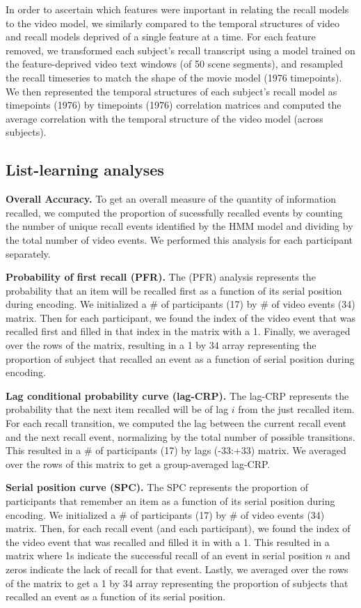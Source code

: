 \documentclass{article}
\begin{document}
In order to ascertain which features were important in relating the recall models to the video model, we similarly compared to the temporal structures of video and recall models deprived of a single feature at a time. For each feature removed, we transformed each subject’s recall transcript using a model trained on the feature-deprived video text windows (of 50 scene segments), and resampled the recall timeseries to match the shape of the movie model (1976 timepoints). We then represented the temporal structures of each subject’s recall model as timepoints (1976) by timepoints (1976) correlation matrices and computed the average correlation with the temporal structure of the video model (across subjects).

\subsection{List-learning analyses}
\textbf{Overall Accuracy.}  To get an overall measure of the quantity of information recalled, we computed the proportion of sucessfully recalled events by counting the number of unique recall events identified by the HMM model and dividing by the total number of video events.  We performed this analysis for each participant separately.

\textbf{Probability of first recall (PFR).}  The (PFR) analysis represents the probability that an item will be recalled first as a function of its serial position during encoding. We initialized a \# of participants (17) by \# of video events (34) matrix. Then for each participant, we found the index of the video event that was recalled first and filled in that index in the matrix with a 1.  Finally, we averaged over the rows of the matrix, resulting in a 1 by 34 array representing the proportion of subject that recalled an event as a function of serial position during encoding.

\textbf{Lag conditional probability curve (lag-CRP).} The lag-CRP represents the probability that the next item recalled will be of lag $i$ from the just recalled item. For each recall transition, we computed the lag between the current recall event and the next recall event, normalizing by the total number of possible transitions.  This resulted in a \# of participants (17) by lags (-33:+33) matrix. We averaged over the rows of this matrix to get a group-averaged lag-CRP.

\textbf{Serial position curve (SPC).} The SPC represents the proportion of participants that remember an item as a function of its serial position during encoding. We initialized a \# of participants (17) by \# of video events (34) matrix. Then, for each recall event (and each participant), we found the index of the video event that was recalled and filled it in with a 1. This resulted in a matrix where 1s indicate the successful recall of an event in serial position $n$ and zeros indicate the lack of recall for that event.  Lastly, we averaged over the rows of the matrix to get a 1 by 34 array representing the proportion of subjects that recalled an event as a function of its serial position.
\end{document}
